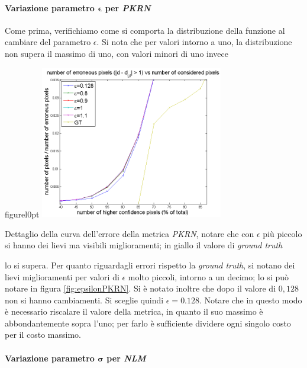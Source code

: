 \documentclass[12pt]{report}
\begin{document}
			\paragraph{Variazione parametro $\bm{\epsilon}$ per \textit{PKRN}}
			\label{par:epsilon}
		
				Come prima, verifichiamo come si comporta la distribuzione della funzione al cambiare del parametro $\epsilon$. Si nota che per valori intorno a uno, la distribuzione non supera il massimo di uno, con valori minori di uno invece
			
				\begin{wrapfloat}{figure}{l}{0pt}
					\includegraphics[width=0.6\textwidth]{./figures/epsilon_PKRN.png}
					\caption{Dettaglio della curva dell'errore della metrica \textit{PKRN}, notare che con $\epsilon$ più piccolo si hanno dei lievi ma visibili miglioramenti; in giallo il valore di \textit{ground truth}}
					\label{fig:epsilonPKRN}
				\end{wrapfloat} 
			
			
				\noindent lo si supera. Per quanto riguardagli errori rispetto la \textit{ground truth}, si notano dei lievi miglioramenti per valori di $\epsilon$ molto piccoli, intorno a un decimo; lo si può notare in figura \ref{fig:epsilonPKRN}. Si è notato inoltre che dopo il valore di $0,128$ non si hanno cambiamenti. Si sceglie quindi $\epsilon=0.128$. Notare che in questo modo è necessario riscalare il valore della metrica, in quanto il suo massimo è abbondantemente sopra l'uno; per farlo è sufficiente dividere ogni singolo costo per il costo massimo. \newline \newline \newline
	
			\paragraph{Variazione parametro $\bm{\sigma}$ per \textit{NLM}}
			\label{par:sigmaNLM}
			
\end{document}
